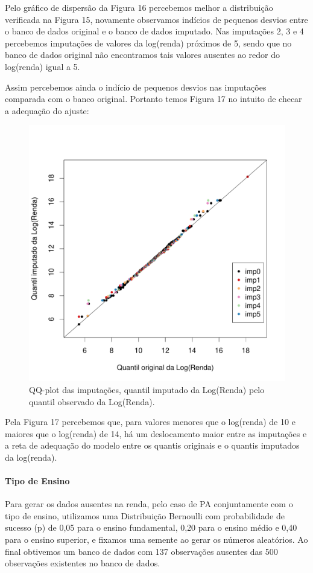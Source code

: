 \documentclass[]{article}
\let\oldparagraph\paragraph
\renewcommand{\paragraph}[1]{\oldparagraph{#1}\mbox{}}
\begin{document}
Pelo gráfico de dispersão da Figura 16 percebemos melhor a distribuição
verificada na Figura 15, novamente observamos indícios de pequenos
desvios entre o banco de dados original e o banco de dados imputado. Nas
imputações 2, 3 e 4 percebemos imputações de valores da log(renda)
próximos de 5, sendo que no banco de dados original não encontramos tais
valores ausentes ao redor do log(renda) igual a 5.

Assim percebemos ainda o indício de pequenos desvios nas imputações
comparada com o banco original. Portanto temos Figura 17 no intuito de
checar a adequação do ajuste:

\begin{figure}[H]

{\centering \includegraphics[width=0.6\linewidth]{p48-graf} 

}

\caption{QQ-plot das imputações, quantil imputado da Log(Renda) pelo quantil observado da Log(Renda).}\label{fig:unnamed-chunk-25}
\end{figure}

Pela Figura 17 percebemos que, para valores menores que o log(renda) de
10 e maiores que o log(renda) de 14, há um deslocamento maior entre as
imputações e a reta de adequação do modelo entre os quantis originais e
o quantis imputados da log(renda).

\paragraph{Tipo de Ensino}\label{tipo-de-ensino}

Para gerar os dados ausentes na renda, pelo caso de PA conjuntamente com
o tipo de ensino, utilizamos uma Distribuição Bernoulli com
probabilidade de sucesso (p) de 0,05 para o ensino fundamental, 0,20
para o ensino médio e 0,40 para o ensino superior, e fixamos uma semente
ao gerar os números aleatórios. Ao final obtivemos um banco de dados com
137 observações ausentes das 500 observações existentes no banco de
dados.
\end{document}

